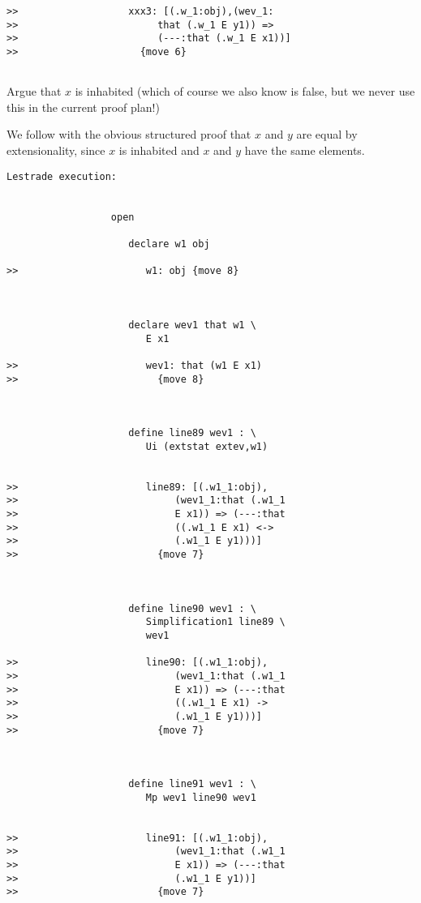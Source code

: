 \documentclass{article}
\begin{document}
{\begin{verbatim}
>>                   xxx3: [(.w_1:obj),(wev_1:
>>                        that (.w_1 E y1)) =>
>>                        (---:that (.w_1 E x1))]
>>                     {move 6}


\end{verbatim}

Argue that $x$ is inhabited (which of course we also know is false, but we never use this in the current proof plan!)

We follow with the obvious structured proof that $x$ and $y$ are equal by extensionality, since $x$ is inhabited and $x$ and $y$ have the same elements.

\begin{verbatim}Lestrade execution:


                  open

                     declare w1 obj

>>                      w1: obj {move 8}



                     declare wev1 that w1 \
                        E x1

>>                      wev1: that (w1 E x1)
>>                        {move 8}



                     define line89 wev1 : \
                        Ui (extstat extev,w1)


>>                      line89: [(.w1_1:obj),
>>                           (wev1_1:that (.w1_1
>>                           E x1)) => (---:that
>>                           ((.w1_1 E x1) <->
>>                           (.w1_1 E y1)))]
>>                        {move 7}



                     define line90 wev1 : \
                        Simplification1 line89 \
                        wev1

>>                      line90: [(.w1_1:obj),
>>                           (wev1_1:that (.w1_1
>>                           E x1)) => (---:that
>>                           ((.w1_1 E x1) ->
>>                           (.w1_1 E y1)))]
>>                        {move 7}



                     define line91 wev1 : \
                        Mp wev1 line90 wev1


>>                      line91: [(.w1_1:obj),
>>                           (wev1_1:that (.w1_1
>>                           E x1)) => (---:that
>>                           (.w1_1 E y1))]
>>                        {move 7}




\end{verbatim}}
\end{document}
